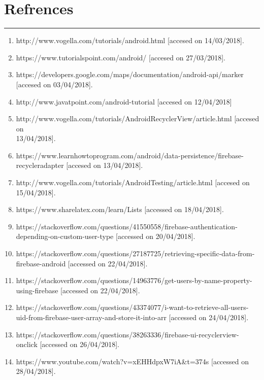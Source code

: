 \chapter{Refrences}\hrule
\label{Chapter:6}
\begin{enumerate}
	\item http://www.vogella.com/tutorials/android.html [accesed on 14/03/2018].
	\item https://www.tutorialspoint.com/android/ [accesed on 27/03/2018].
	\item https://developers.google.com/maps/documentation/android-api/marker [accesed on 03/04/2018].
	\item http://www.javatpoint.com/android-tutorial [accesed on 12/04/2018]
	\item http://www.vogella.com/tutorials/AndroidRecyclerView/article.html [accesed on \\13/04/2018].
	\item https://www.learnhowtoprogram.com/android/data-persistence/firebase-recycleradapter [accesed on 13/04/2018].
	\item 
	http://www.vogella.com/tutorials/AndroidTesting/article.html
	[accesed on 15/04/2018].
	\item 
	https://www.sharelatex.com/learn/Lists [accessed on 18/04/2018].
	\item 
	https://stackoverflow.com/questions/41550558/firebase-authentication-depending-on-custom-user-type [accessed on 20/04/2018].
	\item 
	https://stackoverflow.com/questions/27187725/retrieving-specific-data-from-firebase-android [accessed on 22/04/2018].
	\pagebreak
	\item 
	https://stackoverflow.com/questions/14963776/get-users-by-name-property-using-firebase [accessed on 22/04/2018].
	\item
	https://stackoverflow.com/questions/43374077/i-want-to-retrieve-all-users-uid-from-firebase-user-array-and-store-it-into-arr [accessed on 24/04/2018].
	\item 
	https://stackoverflow.com/questions/38263336/firebase-ui-recyclerview-onclick [accessed on 26/04/2018].
	\item 
	https://www.youtube.com/watch?v=xEHHdpxW7iA&t=374s [accessed on 28/04/2018].
\end{enumerate}